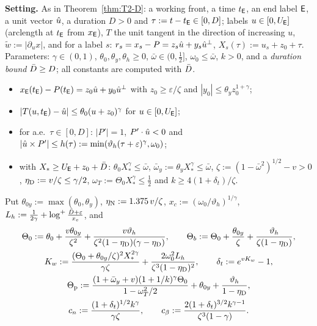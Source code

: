 \noindent\textbf{Setting.} As in Theorem~\ref{thm:T2-D}: a working front, a time $t_{\mathsf E}$, an end label $\mathsf E$, a unit vector $\hat u$,
a duration $D>0$ and $\tau:=t-t_{\mathsf E}\in[0,D]$; labels $u\in[0,U_{\mathsf E}]$ (arclength at $t_{\mathsf E}$ from $x_{\mathsf E}$), $T$ the unit tangent
in the direction of increasing $u$, $\tilde w:=|\partial_ux|$, and for a label $s$: $r_s=x_s-P=z_s\hat u+y_s\hat u^\perp$,
$X_s(\tau):=u_s+z_0+\tau$. Parameters: $\gamma\in(0,1)$, $\theta_0,\theta_y,\theta_h\ge0$, $\bar\omega\in(0,\frac12]$,
$\omega_0\le\bar\omega$, $k>0$, and a \emph{duration bound} $\bar D\ge D$; all constants are computed with $\bar D$.
\begin{itemize}
\item[(D0)] $x_{\mathsf E}(t_{\mathsf E})-P(t_{\mathsf E})=z_0\hat u+y_0\hat u^\perp$ with $z_0\ge\varepsilon/\zeta$ and $|y_0|\le\theta_yz_0^{1+\gamma}$;
\item[(D1)] $|T(u,t_{\mathsf E})-\hat u|\le\theta_0(u+z_0)^\gamma$ for $u\in[0,U_{\mathsf E}]$;
\item[(D2)] for a.e.\ $\tau\in[0,D]$: $|P'|=1$, $P'\cdot\hat u<0$ and $|\hat u\times P'|\le h(\tau):=\min(\vartheta_h(\tau+\varepsilon)^\gamma,\omega_0)$;
\item[(D3)] with $X_*\ge U_{\mathsf E}+z_0+\bar D$: $\theta_0X_*^\gamma\le\bar\omega$, $\bar\omega_y:=\theta_yX_*^\gamma\le\bar\omega$,
$\zeta:=(1-\bar\omega^2)^{1/2}-v>0$, $\eta_{\mathrm D}:=v/\zeta\le\gamma/2$, $\omega_T:=\Theta_0X_*^\gamma\le\frac12$ and
$k\ge4(1+\delta_t)/\zeta$.
\end{itemize}
Put $\theta_{0y}:=\max(\theta_0,\theta_y)$, $\eta_{\mathrm N}:=1.375\,v/\zeta$, $x_c:=(\omega_0/\vartheta_h)^{1/\gamma}$,
$L_h:=\frac1{2\gamma}+\log^+\frac{\bar D+\varepsilon}{x_c}$, and
\begin{gather*}
\Theta_0:=\theta_0+\frac{v\theta_{0y}}{\zeta^2}+\frac{v\vartheta_h}{\zeta^2(1-\eta_{\mathrm D})(\gamma-\eta_{\mathrm D})},\qquad
\Theta_b:=\Theta_0+\frac{\theta_{0y}}\zeta+\frac{\vartheta_h}{\zeta(1-\eta_{\mathrm D})},\\
K_w:=\frac{(\Theta_0+\theta_{0y}/\zeta)^2X_*^{2\gamma}}{\gamma\zeta}+\frac{2\omega_0^2L_h}{\zeta^3(1-\eta_{\mathrm D})^2},\qquad
\delta_t:=e^{vK_w}-1,\\
\Theta_{\mathrm p}:=\frac{(1+\bar\omega_y+v)(1+1/k)^\gamma\Theta_0}{1-\omega_T^2/2}+\theta_{0y}+\frac{\vartheta_h}{1-\eta_{\mathrm D}},\\
c_n:=\frac{(1+\delta_t)^{1/2}k^\gamma}{\gamma\zeta},\qquad c_\beta:=\frac{2(1+\delta_t)^{3/2}k^{\gamma-1}}{\zeta^3(1-\gamma)} .
\end{gather*}


